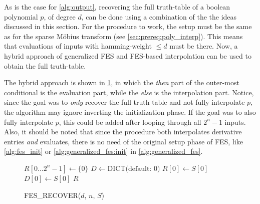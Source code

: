 As is the case for \cref{alg:output}, recovering the full truth-table of a boolean polynomial $p$, of degree $d$, can be done using a combination of the the ideas discussed in this section. For the procedure to work, the setup must be the same as for the sparse Möbius transform (see \cref{sec:prereq:poly_interp}). This means that evaluations of inputs with hamming-weight $\leq d$ must be there. Now, a hybrid approach of generalized FES and FES-based interpolation can be used to obtain the full truth-table. 

The hybrid approach is shown in \cref{alg:fes_recover}, in which the \textit{then} part of the outer-most conditional is the evaluation part, while the \textit{else} is the interpolation part. Notice, since the goal was to \textit{only} recover the full truth-table and not fully interpolate $p$, the algorithm may ignore inverting the initialization phase. If the goal was to also fully interpolate $p$, this could be added after looping through all $2^n - 1$ inputs. Also, it should be noted that since the procedure both interpolates derivative entries \textit{and} evaluates, there is no need of the original setup phase of FES, like \cref{alg:fes_init} or \cref{alg:generalized_fes:init} in \cref{alg:generalized_fes}. 


\begin{figure}[ht]
    \begin{alg}
        $R[0\dots 2^n - 1] \gets \{0\}$\;
        $D \gets \text{DICT(default: 0)}$\;
        $R[0] \gets S[0]$\;
        $D[0] \gets S[0]$\;
        \Return $R$\;
        \caption{FES\_RECOVER($d$, $n$, $S$)} \label{alg:fes_recover}
    \end{alg}
\end{figure}


\newpage
